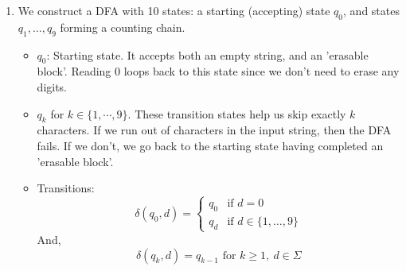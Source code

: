 \documentclass[12pt]{article}
\begin{document}
\begin{solution}
    \bbni
    \begin{enumerate}
        \item [(a)] We construct a DFA with 10 states: a starting (accepting) state $q_0$, and states $q_1, \ldots, q_9$ forming a counting chain. 
        \begin{itemize}
            \item $q_0$: Starting state. It accepts both an empty string, and an 'erasable block'. Reading $0$ loops back to this state since we don't need to erase any digits.
            \item $q_k$ for $k\in \{1, \cdots, 9\}$. These transition states help us skip exactly $k$ characters. If we run out of characters in the input string, then the DFA fails. If we don't, we go back to the starting state having completed an 'erasable block'.
            \item Transitions: 
            \[\delta(q_0, d) = \begin{cases} q_0 & \text{if } d = 0 \\ q_d & \text{if } d \in \{1, \ldots, 9\} \end{cases}\]
            And, 
            \[\delta(q_k, d) = q_{k-1} \text{ for } k \geq 1,\ d \in \Sigma\]
        \end{itemize}
        
        \begin{center}
        \end{center}


\end{enumerate}
\end{solution}
\end{document}
